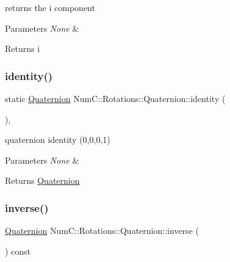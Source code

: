 returns the i component


\begin{DoxyParams}{Parameters}
{\em None} & \\
\hline
\end{DoxyParams}
\begin{DoxyReturn}{Returns}
i 
\end{DoxyReturn}
\mbox{\label{class_num_c_1_1_rotations_1_1_quaternion_a7823fd0bc7e9c2e64e2293e8956367f9}} 
\subsubsection{\texorpdfstring{identity()}{identity()}}
{\footnotesize\ttfamily static \mbox{\hyperlink{class_num_c_1_1_rotations_1_1_quaternion}{Quaternion}} Num\+C\+::\+Rotations\+::\+Quaternion\+::identity (\begin{DoxyParamCaption}{ }\end{DoxyParamCaption})\hspace{0.3cm}{\ttfamily [inline]}, {\ttfamily [static]}}

quaternion identity (0,0,0,1)


\begin{DoxyParams}{Parameters}
{\em None} & \\
\hline
\end{DoxyParams}
\begin{DoxyReturn}{Returns}
\mbox{\hyperlink{class_num_c_1_1_rotations_1_1_quaternion}{Quaternion}} 
\end{DoxyReturn}
\mbox{\label{class_num_c_1_1_rotations_1_1_quaternion_a465bcbcab268a0926685c07d08ff0922}} 
\subsubsection{\texorpdfstring{inverse()}{inverse()}}
{\footnotesize\ttfamily \mbox{\hyperlink{class_num_c_1_1_rotations_1_1_quaternion}{Quaternion}} Num\+C\+::\+Rotations\+::\+Quaternion\+::inverse (\begin{DoxyParamCaption}{ }\end{DoxyParamCaption}) const\hspace{0.3cm}{\ttfamily [inline]}}

